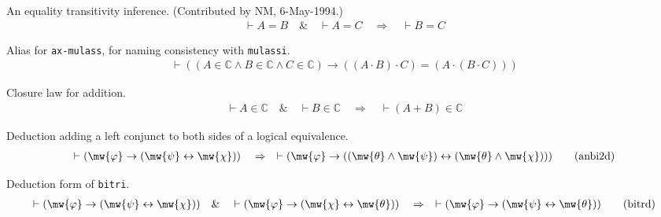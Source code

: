 \begin{lemma} An equality transitivity inference. 
(Contributed by NM, 6-May-1994.)
\begin{align}
\vdash A = B\quad\&\quad \vdash A = C\quad\Rightarrow\quad \vdash B =
    C\label{eq:eqtr3i}\tag{eqtr3i}
\end{align}
\end{lemma}


\begin{lemma} Alias for {\tt ax-mulass}, for naming
consistency with {\tt mulassi}.
\begin{align}
\vdash ( ( A \in \mathbb{C} \wedge B \in \mathbb{C} \wedge C \in \mathbb{C} )
    \rightarrow ( ( A \cdot B ) \cdot C ) = ( A \cdot ( B \cdot C ) )
    )\label{eq:mulass}\tag{mulass}
\end{align}
\end{lemma}


\begin{lemma} Closure law for addition.  
\begin{align}
\vdash A \in \mathbb{C}\quad\&\quad \vdash B \in
    \mathbb{C}\quad\Rightarrow\quad \vdash ( A + B ) \in
    \mathbb{C}\label{eq:addcli}\tag{addcli}
\end{align}
\end{lemma}


\begin{lemma} Deduction adding a left conjunct to both
sides of a logical equivalence.
\begin{align}
\vdash ( \mw{\varphi} \rightarrow ( \mw{\psi} \leftrightarrow \mw{\chi} )
    )\quad\Rightarrow\quad \vdash ( \mw{\varphi} \rightarrow ( ( \mw{\theta}
    \wedge \mw{\psi} ) \leftrightarrow ( \mw{\theta} \wedge \mw{\chi} ) )
    )\label{eq:anbi2d}\tag{anbi2d}
\end{align}
\end{lemma}


\begin{lemma} Deduction form of {\tt bitri}. 
\begin{align}
\vdash ( \mw{\varphi} \rightarrow ( \mw{\psi} \leftrightarrow \mw{\chi} )
    )\quad\&\quad \vdash ( \mw{\varphi} \rightarrow ( \mw{\chi} \leftrightarrow
    \mw{\theta} ) )\quad\Rightarrow\quad \vdash ( \mw{\varphi} \rightarrow (
    \mw{\psi} \leftrightarrow \mw{\theta} ) )\label{eq:bitrd}\tag{bitrd}
\end{align}
\end{lemma}


